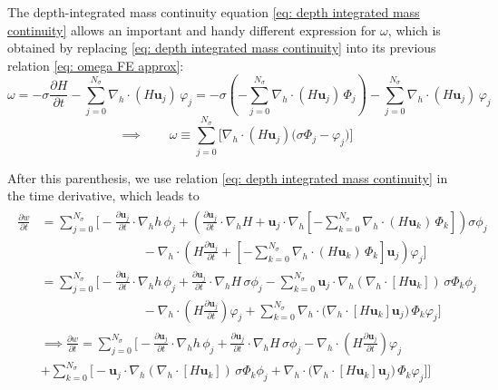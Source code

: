 \documentclass{article}
\newcommand{\Ns}{N_\sigma}
\newcommand{\uj}{\mathbf{u}_j}
\newcommand{\uk}{\mathbf{u}_k}
\newcommand{\sumj}{\sum_{j=0}^{\Ns}}
\newcommand{\sumk}{\sum_{k=0}^{\Ns}}
\newcommand{\nablah}{\nabla_h}
\newcommand{\ddt}[1]{\frac{\partial #1}{\partial t}}
\newcommand{\vphij}{\varphi_j}
\begin{document}
\begin{itemize}
    The depth-integrated mass continuity equation \eqref{eq: depth integrated mass continuity} allows an important and handy different expression for $\omega$, which is obtained by replacing \eqref{eq: depth integrated mass continuity} into its previous relation \eqref{eq: omega FE approx}:
    $$\omega = -\sigma\ddt{H} - \sumj\nablah \cdot \left( H \uj\right) \, \vphij  = -\sigma \left(- \sumj\nablah \cdot \left( H \uj\right) \, \Phi_j \right) - \sumj\nablah \cdot \left( H \uj\right) \, \vphij $$
    \begin{equation}
        \implies \qquad \boxed{\omega\equiv \sumj \bigg[ \nablah \cdot \left( H \uj\right) \Big( \sigma \Phi_j - \vphij\Big) \bigg]}
        \label{eq: omega full FE approx}
    \end{equation}

    After this parenthesis, we use relation \eqref{eq: depth integrated mass continuity} in the time derivative, which leads to
    \begin{multline*}
        \begin{aligned}
            \ddt{w} &= \sumj \Bigg[ -\frac{\partial \uj}{\partial t} \cdot \nablah h \,\phi_j + \left(\frac{\partial \uj}{\partial t} \cdot \nablah H + \uj \cdot \nablah \left[- \sumk\nablah \cdot \left( H \uk\right) \, \Phi_k \right]\right)\sigma \phi_j\\  
            & \qquad\qquad\qquad\qquad- \nablah \cdot \left(H \frac{\partial \uj}{\partial t} + \left[- \sumk\nablah \cdot \left( H \uk\right) \, \Phi_k\right]\uj\right)\vphij \Bigg] \\[1mm]
            &= \sumj \Bigg[ -\frac{\partial \uj}{\partial t} \cdot \nablah h \,\phi_j + \frac{\partial \uj}{\partial t} \cdot \nablah H \, \sigma \phi_j - \sumk \uj \cdot \nablah  \left(\nablah \cdot \left[ H \uk\right] \right) \, \sigma \Phi_k \phi_j\\  
            & \qquad\qquad\qquad\qquad - \nablah \cdot \left(H \frac{\partial \uj}{\partial t} \right)\vphij + \sumk\nablah\cdot \big( \nablah \cdot \left[ H \uk\right]\uj \big) \, \Phi_k \vphij \Bigg]
        \end{aligned}
    \end{multline*}
    \begin{multline}
        \implies \ddt{w}= \sumj \Bigg[ -\frac{\partial \uj}{\partial t} \cdot \nablah h \,\phi_j + \frac{\partial \uj}{\partial t} \cdot \nablah H \, \sigma \phi_j - \nablah \cdot \left(H \frac{\partial \uj}{\partial t} \right)\vphij \\[1mm]
        + \sumk \Big[ - \uj \cdot \nablah  \left(\nablah \cdot \left[ H \uk\right] \right) \, \sigma \Phi_k \phi_j +\nablah\cdot \big( \nablah \cdot \left[ H \uk\right]\uj \big) \, \Phi_k \vphij \Big] \Bigg]
        \label{eq: w time derivative expansion}
    \end{multline}
    

\end{itemize}
\end{document}
